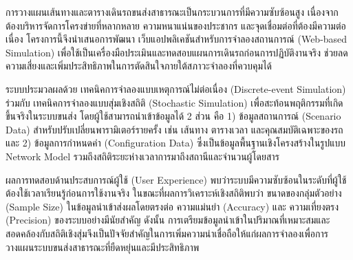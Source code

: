 \maketitle
\makesignature

\ifproject
\begin{abstractTH}
\begin{mypara}
    \indent การวางแผนเส้นทางและตารางเดินรถขนส่งสาธารณะเป็นกระบวนการที่มีความซับซ้อนสูง เนื่องจากต้องบริหารจัดการโครงข่ายที่หลากหลาย ความหนาแน่นของประชากร และจุดเชื่อมต่อที่ต้องมีความต่อเนื่อง โครงการนี้จึงนำเสนอการพัฒนา เว็บแอปพลิเคชันสำหรับการจำลองสถานการณ์ (Web-based Simulation) เพื่อใช้เป็นเครื่องมือประเมินและทดสอบแผนการเดินรถก่อนการปฏิบัติงานจริง ช่วยลดความเสี่ยงและเพิ่มประสิทธิภาพในการตัดสินใจภายใต้สภาวะจำลองที่ควบคุมได้
\end{mypara}
\begin{mypara}
    \indent ระบบประมวลผลด้วย เทคนิคการจำลองแบบเหตุการณ์ไม่ต่อเนื่อง (Discrete-event Simulation) ร่วมกับ เทคนิคการจำลองแบบสุ่มเชิงสถิติ (Stochastic Simulation) เพื่อสะท้อนพฤติกรรมที่เกิดขึ้นจริงในระบบขนส่ง โดยผู้ใช้สามารถนำเข้าข้อมูลได้ 2 ส่วน คือ 1) ข้อมูลสถานการณ์ (Scenario Data) สำหรับปรับเปลี่ยนพารามิเตอร์รายครั้ง เช่น เส้นทาง ตารางเวลา และคุณสมบัติเฉพาะของรถ และ 2) ข้อมูลการกำหนดค่า (Configuration Data) ซึ่งเป็นข้อมูลพื้นฐานเชิงโครงสร้างในรูปแบบ Network Model รวมถึงสถิติระยะห่างเวลาการมาถึงสถานีและจำนวนผู้โดยสาร
\end{mypara}
\begin{mypara}
    \indent ผลการทดสอบด้านประสบการณ์ผู้ใช้ (User Experience) พบว่าระบบมีความซับซ้อนในระดับที่ผู้ใช้ต้องใช้เวลาเรียนรู้ก่อนการใช้งานจริง ในขณะที่ผลการวิเคราะห์เชิงสถิติพบว่า ขนาดของกลุ่มตัวอย่าง (Sample Size) ในข้อมูลนำเข้าส่งผลโดยตรงต่อ ความแม่นยำ (Accuracy) และ ความเที่ยงตรง (Precision) ของระบบอย่างมีนัยสำคัญ ดังนั้น การเตรียมข้อมูลนำเข้าในปริมาณที่เหมาะสมและสอดคล้องกับสถิติเชิงสุ่มจึงเป็นปัจจัยสำคัญในการเพิ่มความน่าเชื่อถือให้แก่ผลการจำลองเพื่อการวางแผนระบบขนส่งสาธารณะที่ยืดหยุ่นและมีประสิทธิภาพ
\end{mypara}
\end{abstractTH}


